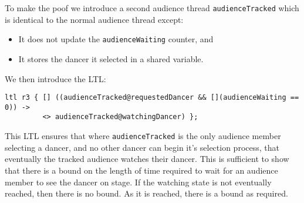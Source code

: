 \documentclass[12pt,a4paper]{scrartcl}
\begin{document}
To make the poof we introduce a second audience thread \texttt{audienceTracked} which is identical to the normal audience thread except:
\begin{itemize}
    \item It does not update the \texttt{audienceWaiting} counter, and
    \item It stores the dancer it selected in a shared variable.
\end{itemize}

We then introduce the LTL:
\begin{lstlisting}
ltl r3 { [] ((audienceTracked@requestedDancer && [](audienceWaiting == 0)) ->
         <> audienceTracked@watchingDancer) };

\end{lstlisting}

This LTL ensures that where \texttt{audienceTracked} is the only audience member selecting a dancer,
    and no other dancer can begin it's selection process, that eventually the tracked audience watches their dancer.
This is sufficient to show that there is a bound on the length of time required to wait for an audience member to see the dancer on stage.
If the watching state is not eventually reached, then there is no bound.
As it is reached, there is a bound as required.
\end{document}
